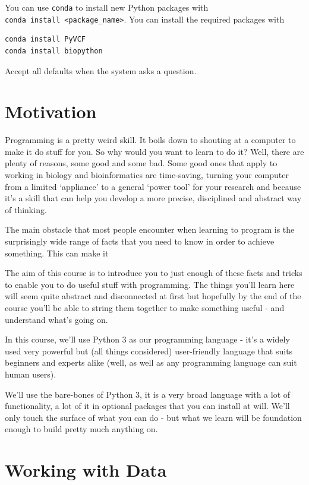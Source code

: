 \documentclass[]{book}
\theoremstyle{definition}
\theoremstyle{definition}
\theoremstyle{definition}
\theoremstyle{remark}
\begin{document}
You can use \texttt{conda} to install new Python packages with
\texttt{conda\ install\ \textless{}package\_name\textgreater{}}. You can
install the required packages with

\begin{verbatim}
conda install PyVCF
conda install biopython
\end{verbatim}

Accept all defaults when the system asks a question.

\hypertarget{motivation}{%
\chapter{Motivation}\label{motivation}}

Programming is a pretty weird skill. It boils down to shouting at a
computer to make it do stuff for you. So why would you want to learn to
do it? Well, there are plenty of reasons, some good and some bad. Some
good ones that apply to working in biology and bioinformatics are
time-saving, turning your computer from a limited `appliance' to a
general `power tool' for your research and because it's a skill that can
help you develop a more precise, disciplined and abstract way of
thinking.

The main obstacle that most people encounter when learning to program is
the surprisingly wide range of facts that you need to know in order to
achieve something. This can make it

The aim of this course is to introduce you to just enough of these facts
and tricks to enable you to do useful stuff with programming. The things
you'll learn here will seem quite abstract and disconnected at first but
hopefully by the end of the course you'll be able to string them
together to make something useful - and understand what's going on.

In this course, we'll use Python 3 as our programming language - it's a
widely used very powerful but (all things considered) user-friendly
language that suits beginners and experts alike (well, as well as any
programming language can suit human users).

We'll use the bare-bones of Python 3, it is a very broad language with a
lot of functionality, a lot of it in optional packages that you can
install at will. We'll only touch the surface of what you can do - but
what we learn will be foundation enough to build pretty much anything
on.

\hypertarget{data}{%
\chapter{Working with Data}\label{data}}
\end{document}
